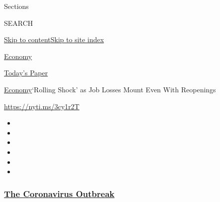 Sections

SEARCH

\protect\hyperlink{site-content}{Skip to
content}\protect\hyperlink{site-index}{Skip to site index}

\href{https://www.nytimes3xbfgragh.onion/section/business/economy}{Economy}

\href{https://myaccount.nytimes3xbfgragh.onion/auth/login?response_type=cookie\&client_id=vi}{}

\href{https://www.nytimes3xbfgragh.onion/section/todayspaper}{Today's
Paper}

\href{/section/business/economy}{Economy}\textbar{}`Rolling Shock' as
Job Losses Mount Even With Reopenings

\url{https://nyti.ms/3cy1r2T}

\begin{itemize}
\item
\item
\item
\item
\item
\item
\end{itemize}

\hypertarget{the-coronavirus-outbreak}{%
\subsubsection{\texorpdfstring{\href{https://www.nytimes3xbfgragh.onion/news-event/coronavirus?name=styln-coronavirus-markets\&region=TOP_BANNER\&block=storyline_menu_recirc\&action=click\&pgtype=Article\&impression_id=42c81110-f52e-11ea-bd9d-0b405bc82d81\&variant=undefined}{The
Coronavirus
Outbreak}}{The Coronavirus Outbreak}}\label{the-coronavirus-outbreak}}

